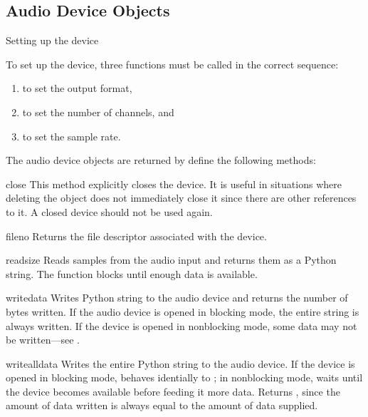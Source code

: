 \subsection{Audio Device Objects \label{ossaudio-device-objects}}

Setting up the device

To set up the device, three functions must be called in the correct
sequence:
\begin{enumerate}
\item {} to set the output format,
\item {} to set the number of channels, and
\item {} to set the sample rate.
\end{enumerate}

The audio device objects are returned by  define the
following methods:

\begin{methoddesc}{close}{}
This method explicitly closes the device.  It is useful in situations
where deleting the object does not immediately close it since there are
other references to it.  A closed device should not be used again.
\end{methoddesc}

\begin{methoddesc}{fileno}{}
Returns the file descriptor associated with the device.
\end{methoddesc}

\begin{methoddesc}{read}{size}
Reads  samples from the audio input and returns them as a
Python string.  The function blocks until enough data is available.
\end{methoddesc}

\begin{methoddesc}{write}{data}
Writes Python string  to the audio device and returns the
number of bytes written.  If the audio device is opened in blocking
mode, the entire string is always written.  If the device is opened in
nonblocking mode, some data may not be written---see
.
\end{methoddesc}

\begin{methoddesc}{writeall}{data}
Writes the entire Python string  to the audio device.  If the
device is opened in blocking mode, behaves identially to
; in nonblocking mode, waits until the device becomes
available before feeding it more data.  Returns , since the
amount of data written is always equal to the amount of data supplied.
\end{methoddesc}

